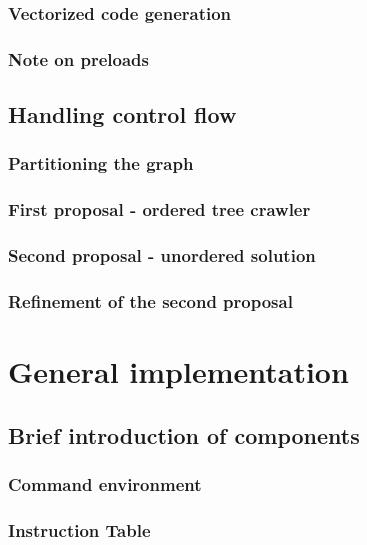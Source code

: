         \subsection{Vectorized code generation}

        \subsection{Note on preloads}

    \section{Handling control flow}

        \subsection{Partitioning the graph}

        \subsection{First proposal - ordered tree crawler}

        \subsection{Second proposal - unordered solution}

        \subsection{Refinement of the second proposal}

\chapter{General implementation}

    \section{Brief introduction of components}

        \subsection{Command environment}

        \subsection{Instruction Table} 

